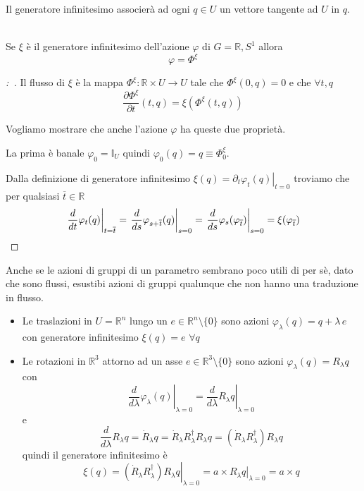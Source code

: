 \documentclass[11pt,a4paper,twoside]{book}
\newenvironment{proposizione}[1][\empty]{\begin{Proposizione}{
\ifx\empty#1\relax\else\mdseries\itshape#1\\\fi
}{}}{\end{Proposizione}}
\newenvironment{esempio}[1][Esempio]{ 
  \begin{center}\begin{tcolorbox}[
  title={#1:\\},
  width=0.9\linewidth,
  flush right,
  enhanced jigsaw, 
  colback=white, 
  frame hidden, 
  sharpish corners, arc=3mm,
  borderline west = {1pt}{0pt}{gray},
  borderline south = {1pt}{0pt}{gray},
  coltitle=black, 
  fonttitle=\small\bfseries, 
  attach title to upper, 
  breakable,
  top=2.5pt, bottom=0.3pt]\small
  }{
 \normalsize \end{tcolorbox}\end{center}
}
\newenvironment{dimo}[1][\proofname]{
	\begin{tcolorbox}[
	breakable, 
	enhanced, 
	interior hidden, 
	frame hidden, 
	borderline west = {1pt}{0pt}{gray}, 
	top=0pt, bottom=0pt, left=0pt]
\begin{proof}[#1:~]
}
{
\end{proof}
\end{tcolorbox}
}
\theoremstyle{esss}
\theoremstyle{dotless}
\numberwithin{equation}{section} %
\begin{document}
Il generatore infinitesimo associerà ad ogni $q\in U$ un vettore tangente ad $U$ in $q$.

\begin{proposizione}
Se $\xi$ è il generatore infinitesimo dell'azione $\varphi$ di $G=\mathbb{R},S^1$ allora
\[
\varphi=\Phi^\xi
\]
\end{proposizione}
\begin{dimo}
Il flusso di $\xi$ è la mappa $\Phi^\xi:\mathbb{R}\times U\rightarrow U$ tale che $\Phi^\xi(0,q)=0$ e che $\forall t,q$
\[
\dfrac{\partial\Phi^\xi}{\partial t}(t,q)=\xi(\Phi^\xi(t,q))
\]

Vogliamo mostrare che anche l'azione $\varphi$ ha queste due proprietà. 

La prima è banale $\varphi_0=\mathbb{I}_U$ quindi $\varphi_0(q)=q\equiv\Phi_0^\xi$.

Dalla definizione di generatore infinitesimo $\xi(q)=\left. \partial_t\varphi_t(q) \right|_{t=0}$ troviamo che per qualsiasi $\overline{t}\in\mathbb{R}$
\[
\left.\dfrac{d}{dt}\varphi_t(q)\right|_{t=\overline{t}}=
\left.\dfrac{d}{ds}\varphi_{s+\overline{t}}(q)\right|_{s=0}=\left.\dfrac{d}{ds}\varphi_s(\varphi_{\overline{t}})\right|_{s=0}=
\xi(\varphi_{\overline{t}}) \qedhere
\]
\end{dimo}


Anche se le azioni di gruppi di un parametro sembrano poco utili di per sè, dato che sono flussi, esustibi azioni di gruppi qualunque che non hanno una traduzione in flusso.

\begin{esempio}[Traslazioni e rotazioni]
\begin{itemize}
\item Le traslazioni in $U=\mathbb{R}^n$ lungo un $e\in\mathbb{R}^n\setminus\{0\}$ sono azioni 
$\varphi_\lambda(q)=q+\lambda \, e$ con generatore infinitesimo $\xi(q) = e$ $\forall q$
\item Le rotazioni in $\mathbb{R}^3$ attorno ad un asse  $e\in\mathbb{R}^3\setminus\{0\}$ sono azioni $\varphi_\lambda(q)=R_\lambda q $ con
\[
\left.\dfrac{d}{d\lambda}\varphi_\lambda(q)\right|_{\lambda=0}=\left.\dfrac{d}{d\lambda}R_\lambda q \right|_{\lambda=0}
\]
e 
\[
\dfrac{d}{d\lambda} R_\lambda q = \dot{R}_\lambda q = \dot{R}_\lambda R_\lambda^\dag R_\lambda q = (\dot{R}_\lambda R_\lambda^\dag)R_\lambda q
\]
quindi il generatore infinitesimo è
\[
\xi(q)=\left. (\dot{R}_\lambda R_\lambda^\dag )R_\lambda q \right|_{\lambda=0} = \left. a\times  R_\lambda q\right|_{\lambda=0} =a\times q
\]
\end{itemize}
\end{esempio}
\end{document}
